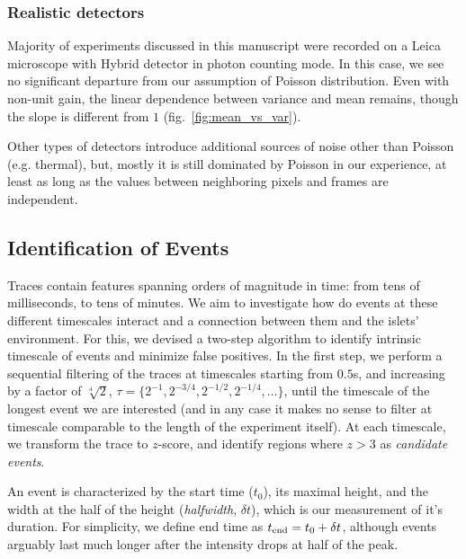 \documentclass[a4paper,11pt,oneside,]{article}
\begin{document}
\subsubsection{Realistic detectors}
Majority of experiments discussed in this manuscript were recorded on a Leica microscope with Hybrid detector in photon counting mode.
In this case, we see no significant departure from our assumption of Poisson distribution.
Even with non-unit gain, the linear dependence between variance and mean remains, though the slope is different from $1$ (fig.~\ref{fig:mean_vs_var}).

Other types of detectors introduce additional sources of noise other than Poisson (e.g. thermal), but, mostly it is still dominated by Poisson in our experience, at least as long as the values between neighboring pixels and frames are independent.


\subsection{Identification of Events}

Traces contain features spanning orders of magnitude in time: from tens of milliseconds, to tens of minutes. 
We aim to investigate how do events at these different timescales interact and a connection between them and the islets' environment.
For this, we devised a two-step algorithm to identify intrinsic timescale of events and minimize false positives.
In the first step, we perform a sequential filtering of the traces at timescales starting from $0.5$s, and increasing by a factor of $\sqrt[4]{2}$,  $\tau = \{2^{-1}, 2^{-3/4}, 2^{-1/2}, 2^{-1/4},\dots\}$, until the timescale of the longest event we are interested (and in any case it makes no sense to filter at timescale comparable to the length of the experiment itself).
At each timescale, we transform the trace to $z$-score, and identify regions where $z>3$ as {\it candidate events}. 

An event is characterized by the start time ($t_0$), its maximal height, and the width at the half of the height ({\it halfwidth}, $\delta t$), which is our measurement of it's duration.
For simplicity, we define end time as $t_{\rm end} = t_0+\delta t$, although events arguably last much longer after the intensity drops at half of the peak.
\end{document}
